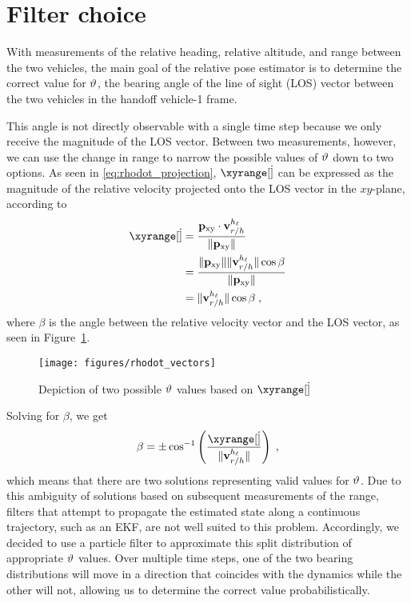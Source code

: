 \section{Filter choice}

With measurements of the relative heading, relative altitude, and range between the two vehicles, the main goal of the relative pose estimator is to determine the correct value for ${{\vartheta}}$, the bearing angle of the line of sight (LOS) vector between the two vehicles in the handoff vehicle-1 frame.

This angle is not directly observable with a single time step because we only receive the magnitude of the LOS vector.
Between two measurements, however, we can use the change in range to narrow the possible values of ${{\vartheta}}$ down to two options.
As seen in \eqref{eq:rhodot_projection}, $\xyrange[\dot]$ can be expressed as the magnitude of the relative velocity projected onto the LOS vector in the $xy$-plane, according to
\begin{align}
    \xyrange[\dot] &= \frac{\pxy \cdot \vrelfull}{\norm{\pxy}}\\
    &= \frac{\norm{\pxy}\norm{\vrelfull}\cos\beta}{\norm{\pxy}}\\
    &= \norm{\vrelfull}\cos\beta
    \;,
\end{align}
where $\beta$ is the angle between the relative velocity vector and the LOS vector, as seen in Figure~\ref{fig:rhodot_vectors}.

\begin{figure}[hbt]
    \centering
    \texttt{[image: figures/rhodot\_vectors]}
    \caption{Depiction of two possible ${{\vartheta}}$ values based on $\xyrange[\dot]$}
    \label{fig:rhodot_vectors}
\end{figure}

Solving for $\beta$, we get
\begin{equation}
    \beta = \pm \acos\left(\frac{\xyrange[\dot]}{\norm{\vrelfull}}\right) \;,
\end{equation}
which means that there are two solutions representing valid values for ${{\vartheta}}$.
Due to this ambiguity of solutions based on subsequent measurements of the range, filters that attempt to propagate the estimated state along a continuous trajectory, such as an EKF, are not well suited to this problem.
Accordingly, we decided to use a particle filter to approximate this split distribution of appropriate ${{\vartheta}}$ values.
Over multiple time steps, one of the two bearing distributions will move in a direction that coincides with the dynamics while the other will not, allowing us to determine the correct value probabilistically.

